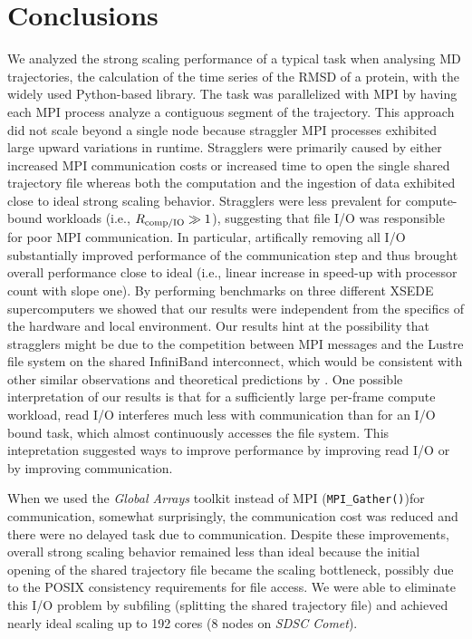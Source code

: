 
\section{Conclusions}
\label{sec:conclusions}

We analyzed the strong scaling performance of a typical task when analysing MD trajectories, the calculation of the time series of the RMSD of a protein, with the widely used Python-based  library.
The task was parallelized with MPI by having each MPI process analyze a contiguous segment of the trajectory.
This approach did not scale beyond a single node because straggler MPI processes exhibited large upward variations in runtime.
Stragglers were primarily caused by either increased MPI communication costs or increased time to open the single shared trajectory file whereas both the computation and the ingestion of data exhibited close to ideal strong scaling behavior.
Stragglers were less prevalent for compute-bound workloads (i.e., $R_{\text{comp/IO}} \gg 1$), suggesting that file I/O was responsible for poor MPI communication.
In particular, artifically removing all I/O substantially improved performance of the communication step and thus brought overall performance close to ideal (i.e., linear increase in speed-up with processor count with slope one).
By performing benchmarks on three different XSEDE supercomputers we showed that our results were independent from the specifics of the hardware and local environment.
Our results hint at the possibility that stragglers might be due to the competition between MPI messages and the Lustre file system on the shared InfiniBand interconnect, which would be consistent with other similar observations \cite{VMD2013} and theoretical predictions by \citet{Brown:2018ab}.
One possible interpretation of our results is that for a sufficiently large per-frame compute workload, read I/O interferes much less with communication than for an I/O bound task, which almost continuously accesses the file system.
This intepretation suggested ways to improve performance by improving read I/O or by improving communication.

When we used the \emph{Global Arrays} toolkit instead of MPI (\texttt{MPI\_Gather()})for communication, somewhat surprisingly, the communication cost was reduced and there were no delayed task due to communication.
Despite these improvements, overall strong scaling behavior remained less than ideal because the initial opening of the shared trajectory file became the scaling bottleneck, possibly due to the POSIX consistency requirements for file access.
We were able to eliminate this I/O problem by subfiling (splitting the shared trajectory file) and achieved nearly ideal scaling up to 192 cores (8 nodes on \emph{SDSC Comet}).

